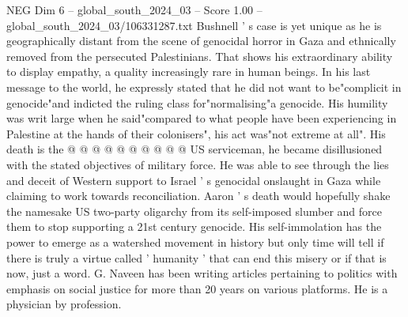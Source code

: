 \begin{textsample}{NEG Dim 6 – global\_south\_2024\_03 – Score 1.00 – global\_south\_2024\_03/106331287.txt}
Bushnell ' s case is yet unique as he is geographically distant from the scene of genocidal horror in Gaza and ethnically removed from the persecuted Palestinians.
That shows his extraordinary ability to display empathy, a quality increasingly rare in human beings.
In his last message to the world, he expressly stated that he did not want to be"complicit in genocide"and indicted the ruling class for"normalising"a genocide.
His humility was writ large when he said"compared to what people have been experiencing in Palestine at the hands of their colonisers", his act was"not extreme at all".
His death is the @ @ @ @ @ @ @ @ @ @ US serviceman, he became disillusioned with the stated objectives of military force.
He was able to see through the lies and deceit of Western support to Israel ' s genocidal onslaught in Gaza while claiming to work towards reconciliation.
Aaron ' s death would hopefully shake the namesake US two-party oligarchy from its self-imposed slumber and force them to stop supporting a 21st century genocide.
His self-immolation has the power to emerge as a watershed movement in history but only time will tell if there is truly a virtue called ' humanity ' that can end this misery or if that is now, just a word.
G.
Naveen has been writing articles pertaining to politics with emphasis on social justice for more than 20 years on various platforms.
He is a physician by profession.

\end{textsample}
